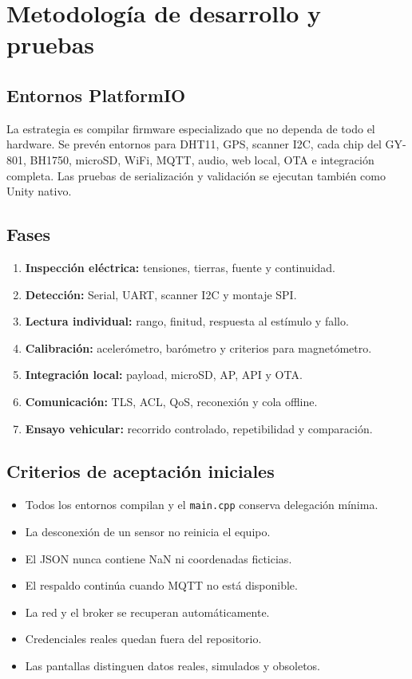 \documentclass[11pt,a4paper,oneside]{report}
\begin{document}
\chapter{Metodología de desarrollo y pruebas}

\section{Entornos PlatformIO}
La estrategia es compilar firmware especializado que no dependa de todo el hardware.
Se prevén entornos para DHT11, GPS, scanner I2C, cada chip del GY-801, BH1750,
microSD, WiFi, MQTT, audio, web local, OTA e integración completa. Las pruebas de
serialización y validación se ejecutan también como Unity nativo.

\section{Fases}
\begin{enumerate}
  \item \textbf{Inspección eléctrica:} tensiones, tierras, fuente y continuidad.
  \item \textbf{Detección:} Serial, UART, scanner I2C y montaje SPI.
  \item \textbf{Lectura individual:} rango, finitud, respuesta al estímulo y fallo.
  \item \textbf{Calibración:} acelerómetro, barómetro y criterios para magnetómetro.
  \item \textbf{Integración local:} payload, microSD, AP, API y OTA.
  \item \textbf{Comunicación:} TLS, ACL, QoS, reconexión y cola offline.
  \item \textbf{Ensayo vehicular:} recorrido controlado, repetibilidad y comparación.
\end{enumerate}

\section{Criterios de aceptación iniciales}
\begin{itemize}
  \item Todos los entornos compilan y el \texttt{main.cpp} conserva delegación mínima.
  \item La desconexión de un sensor no reinicia el equipo.
  \item El JSON nunca contiene NaN ni coordenadas ficticias.
  \item El respaldo continúa cuando MQTT no está disponible.
  \item La red y el broker se recuperan automáticamente.
  \item Credenciales reales quedan fuera del repositorio.
  \item Las pantallas distinguen datos reales, simulados y obsoletos.
\end{itemize}
\end{document}
